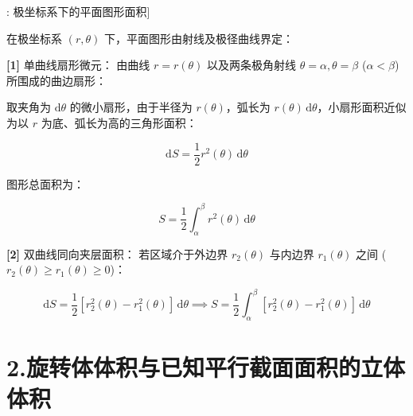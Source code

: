 \documentclass[11pt,a4paper,UTF8]{ctexart}
\begin{document}
\begin{thmbox}[公式[3]: 极坐标系下的平面图形面积]

在极坐标系 $(r, \theta)$ 下，平面图形由射线及极径曲线界定：

\textbf{[1]} 单曲线扇形微元：
由曲线 $r = r(\theta)$ 以及两条极角射线 $\theta = \alpha, \theta = \beta$ ($\alpha < \beta$) 所围成的曲边扇形：

取夹角为 $\mathrm{d}\theta$ 的微小扇形，由于半径为 $r(\theta)$，弧长为 $r(\theta)\,\mathrm{d}\theta$，小扇形面积近似为以 $r$ 为底、弧长为高的三角形面积：


\begin{equation*}
\mathrm{d}S = \frac{1}{2}r^2(\theta)\,\mathrm{d}\theta
\end{equation*}


图形总面积为：


\begin{equation*}
S = \frac{1}{2}\int_\alpha^\beta r^2(\theta)\,\mathrm{d}\theta
\end{equation*}


\textbf{[2]} 双曲线同向夹层面积：
若区域介于外边界 $r_2(\theta)$ 与内边界 $r_1(\theta)$ 之间 ($r_2(\theta) \geqslant r_1(\theta) \geqslant 0$)：


\begin{equation*}
\mathrm{d}S = \frac{1}{2}[r_2^2(\theta) - r_1^2(\theta)]\,\mathrm{d}\theta \implies S = \frac{1}{2}\int_\alpha^\beta [r_2^2(\theta) - r_1^2(\theta)]\,\mathrm{d}\theta
\end{equation*}


\end{thmbox}

\section{2.旋转体体积与已知平行截面面积的立体体积}
\end{document}
